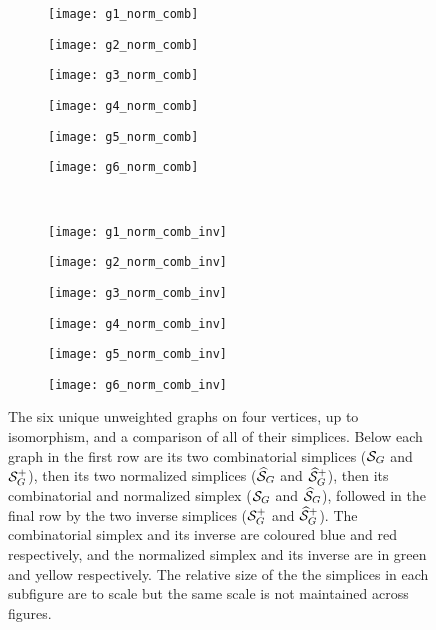 \begin{figure}[h]
\vspace{0.3cm}
\begin{subfigure}[b]{0.16\textwidth}
	\centering
	\texttt{[image: g1\_norm\_comb]}
\end{subfigure}
\begin{subfigure}[b]{0.16\textwidth}
	\centering
	\texttt{[image: g2\_norm\_comb]}
\end{subfigure}
\begin{subfigure}[b]{0.16\textwidth}
	\centering
	\texttt{[image: g3\_norm\_comb]}
\end{subfigure}
\begin{subfigure}[b]{0.16\textwidth}
	\centering
	\texttt{[image: g4\_norm\_comb]}
\end{subfigure}
\begin{subfigure}[b]{0.16\textwidth}
	\centering
	\texttt{[image: g5\_norm\_comb]}
\end{subfigure}
\begin{subfigure}[b]{0.16\textwidth}
	\centering
	\texttt{[image: g6\_norm\_comb]}
\end{subfigure}\\
\vspace{0.3cm}
\begin{subfigure}[b]{0.16\textwidth}
	\centering
	\texttt{[image: g1\_norm\_comb\_inv]}
\end{subfigure}
\begin{subfigure}[b]{0.16\textwidth}
	\centering
	\texttt{[image: g2\_norm\_comb\_inv]}
\end{subfigure}
\begin{subfigure}[b]{0.16\textwidth}
	\centering
	\texttt{[image: g3\_norm\_comb\_inv]}
\end{subfigure}
\begin{subfigure}[b]{0.16\textwidth}
	\centering
	\texttt{[image: g4\_norm\_comb\_inv]}
\end{subfigure}
\begin{subfigure}[b]{0.16\textwidth}
	\centering
	\texttt{[image: g5\_norm\_comb\_inv]}
\end{subfigure}
\begin{subfigure}[b]{0.16\textwidth}
	\centering
	\texttt{[image: g6\_norm\_comb\_inv]}
\end{subfigure}
\caption{The six  unique unweighted  graphs on four vertices, up to isomorphism, and a comparison of all of their simplices. Below each graph in the first row are  its two combinatorial simplices  ($\mathcal{S}_G$ and $\mathcal{S}_G^+$), then its two  normalized simplices ($\widehat{\mathcal{S}}_G$ and $\widehat{\mathcal{S}}_G^+$), then its combinatorial and normalized simplex ($\mathcal{S}_G$ and $\widehat{\mathcal{S}}_G$), followed in  the final  row  by the two inverse simplices ($\mathcal{S}_G^+$ and $\widehat{\mathcal{S}}_G^+$).  The combinatorial simplex and its  inverse are coloured blue and red respectively, and the normalized simplex and its inverse are in green and yellow respectively. The relative size of the the simplices in each subfigure are to scale but the same scale  is not maintained across figures.  }
\label{fig:all_simplices}
\end{figure}







